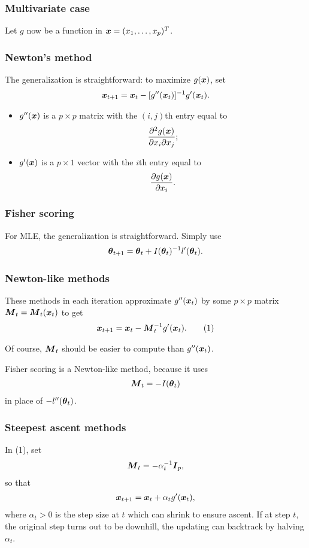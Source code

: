   \begin{frame}
  \frametitle{Multivariate case}
  Let $g$ now be a function in $\boldsymbol{x} = ({x}_1, \ldots, {x}_{p})\sp{T}$.

  \frametitle{Newton's method}
  The generalization is straightforward: to
  maximize $g(\boldsymbol{x})$, set
  \begin{align*}
    \boldsymbol{x}_{t+1} = \boldsymbol{x}_t - [g''(\boldsymbol{x}_t)]^{-1} g'(\boldsymbol{x}_t).
  \end{align*}
  \begin{itemize}
  \item $g''(\boldsymbol{x})$ is a $p\times p$ matrix with the $(i,j)$th
    entry equal to
    \begin{align*}
      \frac{\partial^2 g(\boldsymbol{x})}{\partial x_i\partial x_j};
    \end{align*}
  \item $g'(\boldsymbol{x})$ is a $p\times 1$ vector with the $i$th entry equal
    to
    \begin{align*}
      \frac{\partial g(\boldsymbol{x})}{\partial x_i}.
    \end{align*}
  \end{itemize}

  \end{frame}

  \begin{frame}
  \frametitle{Fisher scoring} For MLE, the generalization is
  straightforward.  Simply use
  \begin{align*}
    \boldsymbol{\theta}_{t+1} = \boldsymbol{\theta}_t + I(\boldsymbol{\theta}_t)^{-1}
    l'(\boldsymbol{\theta}_t).
  \end{align*}

  \frametitle{Newton-like methods}
  These methods in each iteration approximate $g''(\boldsymbol{x}_t)$ by some
  $p\times p$ matrix $\boldsymbol{M}_t = \boldsymbol{M}_t(\boldsymbol{x}_t)$ to get
  \begin{align*}
    \boldsymbol{x}_{t+1} = \boldsymbol{x}_t - \boldsymbol{M}_t^{-1} g'(\boldsymbol{x}_t).   \tag{1}
  \end{align*}

  Of course, $\boldsymbol{M}_t$ should be easier to compute than $g''(\boldsymbol{x}_t)$.

  Fisher scoring is a Newton-like method, because it uses
  \begin{align*}
    \boldsymbol{M}_t=-I(\boldsymbol{\theta}_t)
  \end{align*}
  in place of $-l''(\boldsymbol{\theta}_t)$.

  \end{frame}

  \begin{frame}
  \frametitle{Steepest ascent methods}  In (1), set
  \begin{align*}
    \boldsymbol{M}_t = -\alpha_t^{-1}\boldsymbol{I}_p,
  \end{align*}
  so that
  \begin{align*}
    \boldsymbol{x}_{t+1} = \boldsymbol{x}_t + \alpha_t g'(\boldsymbol{x}_t),
  \end{align*}
  where $\alpha_t>0$ is the step size at $t$ which can shrink to
  ensure ascent.  If at step $t$, the original step turns
  out to be downhill, the updating can backtrack by halving
  $\alpha_t$.
\end{frame}


